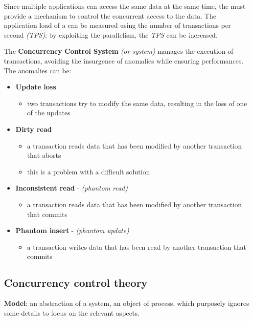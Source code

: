 \documentclass[english]{article}
\begin{document}
Since multiple applications can access the same data at the same time, the \dbms must provide a mechanism to control the concurrent access to the data.
The application load of a \dbms can be measured using the number of transactions per second \textit{(TPS)};
by exploiting the parallelism, the \textit{TPS} can be increased.

The \textbf{Concurrency Control System} \textit{(or \CC system)} manages the execution of transactions, avoiding the insurgence of anomalies while ensuring performances.
The anomalies can be:

\begin{itemize}
  \item \textbf{Update loss}
        \begin{itemize}
          \item two transactions try to modify the same data, resulting in the loss of one of the updates
        \end{itemize}
  \item \textbf{Dirty read}
        \begin{itemize}
          \item a transaction reads data that has been modified by another transaction that aborts
          \item this is a problem with a difficult solution
        \end{itemize}
  \item \textbf{Inconsistent read} - \textit{(phantom read)}
        \begin{itemize}
          \item a transaction reads data that has been modified by another transaction that commits
        \end{itemize}
  \item \textbf{Phantom insert} - \textit{(phantom update)}
        \begin{itemize}
          \item a transaction writes data that has been read by another transaction that commits
        \end{itemize}
\end{itemize}

\subsection{Concurrency control theory}

\textbf{Model}: an abstraction of a system, an object of process, which purposely ignores some details to focus on the relevant aspects.
\end{document}
